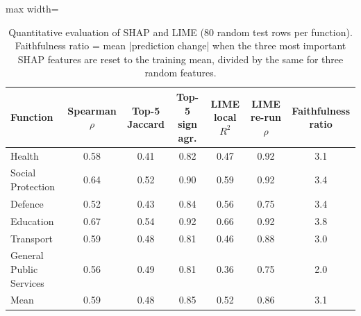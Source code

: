 \begin{table}
\caption{Quantitative evaluation of SHAP and LIME (80 random test rows per function). Faithfulness ratio = mean |prediction change| when the three most important SHAP features are reset to the training mean, divided by the same for three random features.}\label{tab:xai}
\centering\small
\renewcommand{\arraystretch}{1.1}
\begin{adjustbox}{max width=\linewidth}
\begin{tabular}{lcccccc}
\toprule
Function & Spearman $\rho$ & Top-5 Jaccard & Top-5 sign agr. & LIME local $R^2$ & LIME re-run $\rho$ & Faithfulness ratio \\
\midrule
Health & 0.58 & 0.41 & 0.82 & 0.47 & 0.92 & 3.1 \\
Social Protection & 0.64 & 0.52 & 0.90 & 0.59 & 0.92 & 3.4 \\
Defence & 0.52 & 0.43 & 0.84 & 0.56 & 0.75 & 3.4 \\
Education & 0.67 & 0.54 & 0.92 & 0.66 & 0.92 & 3.8 \\
Transport & 0.59 & 0.48 & 0.81 & 0.46 & 0.88 & 3.0 \\
General Public Services & 0.56 & 0.49 & 0.81 & 0.36 & 0.75 & 2.0 \\
\midrule
Mean & 0.59 & 0.48 & 0.85 & 0.52 & 0.86 & 3.1 \\
\bottomrule
\end{tabular}\end{adjustbox}
\end{table}
